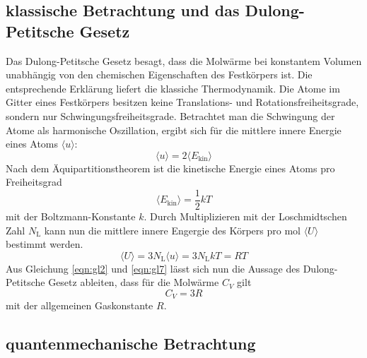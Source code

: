 \subsection{klassische Betrachtung und das Dulong-Petitsche Gesetz}
\label{sec:klassisch}

Das Dulong-Petitsche Gesetz besagt, dass die Molwärme bei konstantem Volumen unabhängig von den chemischen Eigenschaften des Festkörpers ist.
Die entsprechende Erklärung liefert die klassiche Thermodynamik.
Die Atome im Gitter eines Festkörpers besitzen keine Translations- und Rotationsfreiheitsgrade, sondern nur Schwingungsfreiheitsgrade.
Betrachtet man die Schwingung der Atome als harmonische Oszillation, ergibt sich für die mittlere innere Energie eines Atoms $\langle u \rangle$:
\begin{equation}
  \langle u \rangle = 2 \langle E_\text{kin} \rangle
  \label{eqn:gl5}
\end{equation}
Nach dem Äquipartitionstheorem ist die kinetische Energie eines Atoms pro Freiheitsgrad
\begin{equation}
  \langle E_\text{kin} \rangle = \frac{1}{2} k T
  \label{eqn:gl6}
\end{equation}
mit der Boltzmann-Konstante $k$.
Durch Multiplizieren mit der Loschmidtschen Zahl $N_\text{L}$ kann nun die mittlere innere Engergie des Körpers pro \si{\mol} $\langle U \rangle$ bestimmt werden.
\begin{equation}
  \langle U \rangle = 3 N_\text{L} \langle u \rangle = 3 N_\text{L} k T = R T
  \label{eqn:gl7}
\end{equation}
Aus Gleichung \eqref{eqn:gl2} und \eqref{eqn:gl7} lässt sich nun die Aussage des Dulong-Petitsche Gesetz ableiten, dass für die Molwärme $C_V$ gilt
\begin{equation}
  C_V = 3 R
  \label{eqn:gl8}
\end{equation}
mit der allgemeinen Gaskonstante $R$.

\subsection{quantenmechanische Betrachtung}
\label{sec:quantenmechanisch}

